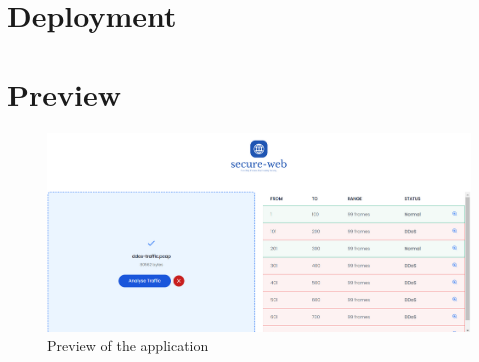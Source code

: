 \section{Deployment}

\section{Preview}
\begin{figure}[h]
	\centering
	\includegraphics[width=1\textwidth]{./assets/images/preview.png}
	\caption{Preview of the application}
\end{figure} 